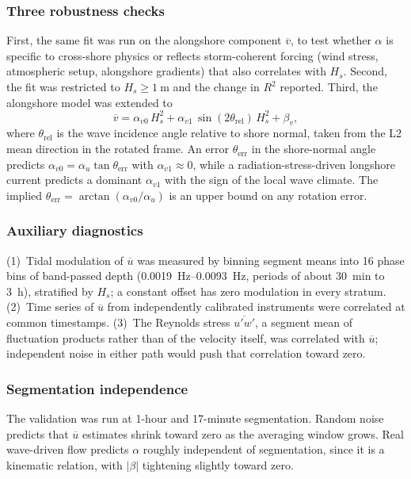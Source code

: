 \subsubsection{Three robustness checks}
First, the same fit was run on the alongshore component $\overline{v}$, to test
whether $\alpha$ is specific to cross-shore physics or reflects storm-coherent
forcing (wind stress, atmospheric setup, alongshore gradients) that also
correlates with $H_s$. Second, the fit was restricted to
$H_s \geq \SI{1}{\meter}$ and the change in $R^2$ reported. Third, the alongshore
model was extended to
%
\begin{equation}
  \overline{v} = \alpha_{v0}\, H_s^2 + \alpha_{v1}\, \sin(2\theta_\text{rel})\, H_s^2 + \beta_v,
  \label{eq:wave_dir_check}
\end{equation}
%
where $\theta_\text{rel}$ is the wave incidence angle relative to shore normal,
taken from the L2 mean direction in the rotated frame. An error
$\theta_\text{err}$ in the shore-normal angle predicts
$\alpha_{v0} = \alpha_u \tan\theta_\text{err}$ with $\alpha_{v1} \approx 0$,
while a radiation-stress-driven longshore current predicts a dominant
$\alpha_{v1}$ with the sign of the local wave climate. The implied
$\theta_\text{err} = \arctan(\alpha_{v0}/\alpha_u)$ is an upper bound on any
rotation error.

\subsubsection{Auxiliary diagnostics}
(1)~Tidal modulation of $\overline{u}$ was measured by binning segment means
into 16 phase bins of band-passed depth (\SIrange{0.0019}{0.0093}{\hertz}, periods
of about \SI{30}{\minute} to \SI{3}{\hour}), stratified by $H_s$; a constant
offset has zero modulation in every stratum. (2)~Time series of $\overline{u}$
from independently calibrated instruments were correlated at common timestamps.
(3)~The Reynolds stress $\overline{u'w'}$, a segment mean of fluctuation
products rather than of the velocity itself, was correlated with
$\overline{u}$; independent noise in either path would push that correlation
toward zero.

\subsubsection{Segmentation independence}
The validation was run at 1-hour and 17-minute segmentation. Random noise
predicts that $\overline{u}$ estimates shrink toward zero as the averaging window
grows. Real wave-driven flow predicts $\alpha$ roughly independent of
segmentation, since it is a kinematic relation, with $|\beta|$ tightening
slightly toward zero.
